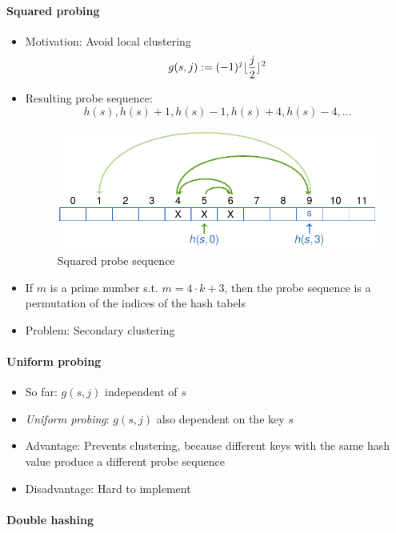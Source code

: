 \documentclass[12pt, a4paper]{scrartcl}
\DeclarePairedDelimiter{\floor}{\lfloor}{\rfloor}
\begin{document}
\paragraph{Squared probing}
\begin{itemize}
\item Motivation: Avoid local clustering
  \begin{equation}
    g(s,j):=(-1)^j\floor{\frac{j}{2}}^2
  \end{equation}
\item Resulting probe sequence:
  \[h(s),h(s)+1, h(s)-1, h(s)+4, h(s)-4,...\]
\begin{figure}[!htbp]
  \centering
  \includegraphics[width=.7\textwidth]{squared_probing}
  \caption{Squared probe sequence}
  \label{fig:squared_probing}
\end{figure}
\item If $m$ is a prime number s.t. $m=4\cdot k+3$, then the probe sequence is a permutation of the indices of the hash tabels
\item Problem: Secondary clustering
\end{itemize}
\paragraph{Uniform probing}

\begin{itemize}
\item So far: $g(s,j)$ independent of $s$
\item \emph{Uniform probing}: $g(s,j)$ also dependent on the key $s$
\item Advantage: Prevents clustering, because different keys with the same hash value produce a different probe sequence
\item Disadvantage: Hard to implement
\end{itemize}
\paragraph{Double hashing}
\end{document}
